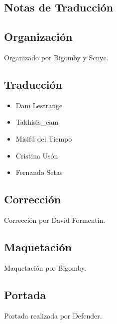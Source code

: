 \begin{center}
\section*{Notas de Traducción}
\end{center}

\subsection*{Organización}\label{organizaciuxf3n}
Organizado por Bigomby y Scnyc.

\subsection*{Traducción}\label{traducciuxf3n}

\begingroup
\begin{multicols}{2}

\begin{itemize}
\item
  Dani Lestrange
\item
  Takhisis\_eam
\item
  Misifú del Tiempo
\item
  Cristina Usón
\item
  Fernando Setas
\end{itemize}

\end{multicols}
\endgroup

\subsection*{Corrección}\label{correcciuxf3n}
Corrección por David Formentin.

\subsection*{Maquetación}\label{maquetaciuxf3n}
Maquetación por Bigomby.

\subsection*{Portada}\label{portada}
Portada realizada por Defender.

